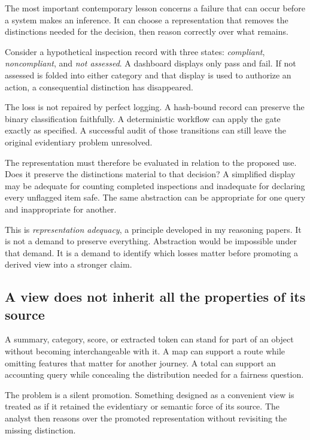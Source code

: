 \documentclass[11pt]{article}
\begin{document}
The most important contemporary lesson concerns a failure that can occur
before a system makes an inference. It can choose a representation that
removes the distinctions needed for the decision, then reason correctly
over what remains.

Consider a hypothetical inspection record with three states:
\emph{compliant}, \emph{noncompliant}, and \emph{not assessed}.
A dashboard displays only pass and fail. If not assessed is folded
into either category and that display is used to authorize an action,
a consequential distinction has disappeared.

The loss is not repaired by perfect logging. A hash-bound record can preserve
the binary classification faithfully. A deterministic workflow can apply
the gate exactly as specified. A successful audit of those transitions can
still leave the original evidentiary problem unresolved.

The representation must therefore be evaluated in relation to the proposed
use. Does it preserve the distinctions material to that decision? A simplified
display may be adequate for counting completed inspections and inadequate
for declaring every unflagged item safe. The same abstraction can be
appropriate for one query and inappropriate for another.

This is \emph{representation adequacy}, a principle developed in my reasoning
papers.\cite{reliability,rprp} It is not a demand to preserve everything.
Abstraction would be impossible under that demand. It is a demand to identify
which losses matter before promoting a derived view into a stronger claim.

\subsection{A view does not inherit all the properties of its source}

A summary, category, score, or extracted token can stand for part of an
object without becoming interchangeable with it. A map can support a route
while omitting features that matter for another journey. A total can support
an accounting query while concealing the distribution needed for a fairness
question.

The problem is a silent promotion. Something designed as a convenient view
is treated as if it retained the evidentiary or semantic force of its source.
The analyst then reasons over the promoted representation without revisiting
the missing distinction.
\end{document}
